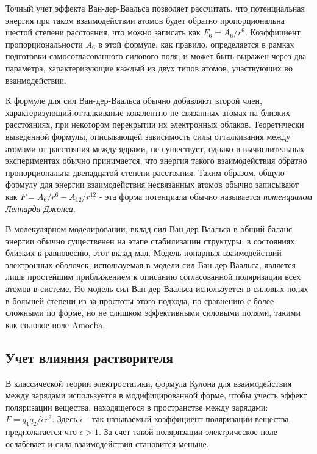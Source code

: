 Точный учет эффекта Ван-дер-Ваальса позволяет рассчитать, что потенциальная энергия при таком взаимодействии атомов будет обратно пропорциональна шестой степени расстояния, что можно записать как $F_6=A_6/r^6$. Коэффициент пропорциональности $A_6$ в этой формуле, как правило, определяется в рамках подготовки самосогласованного силового поля, и может быть выражен через два параметра, характеризующие каждый из двух типов атомов, участвующих во взаимодействии.

К формуле для сил Ван-дер-Ваальса обычно добавляют второй член, характеризующий отталкивание ковалентно не связанных атомах на близких расстояниях, при некотором перекрытии их электронных облаков. Теоретически выведенной формулы, описывающей зависимость силы отталкивания между атомами от расстояния между ядрами, не существует, однако в вычислительных экспериментах обычно принимается, что энергия такого взаимодействия обратно пропорциональна двенадцатой степени расстояния. Таким образом, общую формулу для энергии взаимодействия несвязанных атомов обычно записывают как $F = A_6/r^6 - A_{12}/r^{12}$ - эта форма потенциала обычно называется \textit{потенциалом Леннарда-Джонса}.

В молекулярном моделировании, вклад сил Ван-дер-Ваальса в общий баланс энергии обычно существенен на этапе стабилизации структуры; в состояниях, близких к равновесию, этот вклад мал. Модель попарных взаимодействий электронных оболочек, используемая в модели сил Ван-дер-Ваальса, является лишь простейшим приближением к описанию согласованной поляризации всех атомов в системе. Но модель сил Ван-дер-Ваальса используется в силовых полях в большей степени из-за простоты этого подхода, по сравнению с более сложными по форме, но не слишком эффективными силовыми полями, такими как силовое поле Amoeba.

\subsection{Учет влияния растворителя}

В классической теории электростатики, формула Кулона для взаимодействия между зарядами используется в модифицированной форме, чтобы учесть эффект поляризации вещества, находящегося в пространстве между зарядами: $F =  q_1 q_2/ \epsilon r^2$. Здесь $\epsilon$ - так называемый коэффициент поляризации вещества, предполагается что $\epsilon > 1$. За счет такой поляризации электрическое поле ослабевает и сила взаимодействия становится меньше. 

